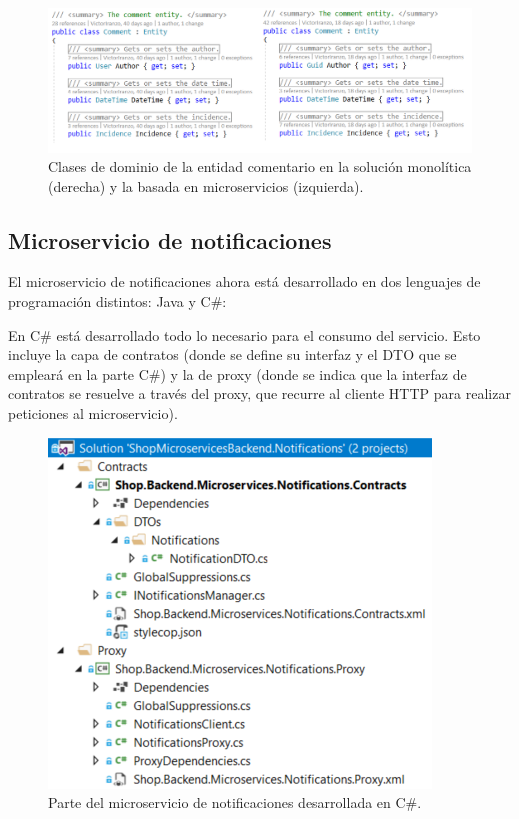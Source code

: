 \documentclass[11pt,spanish,listoffigures]{tfgetsinf}
\begin{document}
\begin{figure}[h]
\centering
\includegraphics[scale=0.7]{Comment}
\caption{Clases de dominio de la entidad comentario en la solución monolítica (derecha) y la basada en microservicios (izquierda).}
\label{fig:Comment}
\end{figure}

\newpage

\subsection{Microservicio de notificaciones}

El microservicio de notificaciones ahora está desarrollado en dos lenguajes de programación distintos: Java y C\#:

En C\# está desarrollado todo lo necesario para el consumo del servicio. Esto incluye la capa de contratos (donde se define su interfaz y el DTO que se empleará en la parte C\#) y la de proxy (donde se indica que la interfaz de contratos se resuelve a través del proxy, que recurre al cliente HTTP para realizar peticiones al microservicio).

\begin{figure}[h]
\centering
\includegraphics[scale=0.85]{NotificationsC}
\caption{Parte del microservicio de notificaciones desarrollada en C\#.}
\end{figure}
\end{document}

